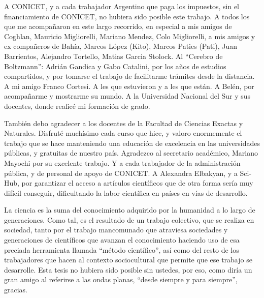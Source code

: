 A CONICET, y a cada trabajador Argentino que paga los impuestos, 
sin el financiamiento de CONICET, no hubiera sido posible este trabajo. 
A todos los que me acompañaron en este largo recorrido, 
en especial a mis amigos de Coghlan, Mauricio Migliorelli, Mariano Mendez, Colo Migliorelli, a mis amigos y 
ex compañeros de Bahía, Marcos López (Kito), Marcos Paties (Pati), Juan Barrientos, Alejandro 
Tortello, Matias Garcia Stolock. Al ``Cerebro de Boltzmann'': Adrián Gandica y Gabo Catalini, por 
los años de estudios compartidos, y por tomarse el trabajo de facilitarme trámites desde la distancia. A mi amigo Franco Cortesi. A les que estuvieron y a les que están. A Belén, 
por acompañarme y mostrarme su mundo. A la Universidad Nacional del Sur y sus 
docentes, donde realicé mi formación de grado.

También debo agradecer a los docentes de la Facultad de Ciencias Exactas y Naturales. 
Disfruté muchísimo cada curso que hice, y valoro enormemente el trabajo 
que se hace manteniendo una educación de excelencia en las universidades públicas, 
y gratuitas de nuestro país.
Agradezco al secretario académico, 
Mariano Mayochi por su excelente trabajo. 
Y a cada trabajador de la administración pública, y de personal de apoyo de 
CONICET. A Alexandra Elbakyan, y a Sci-Hub, por garantizar el acceso 
a artículos científicos que de otra forma sería muy difícil conseguir, 
dificultando la labor científica en países en vías de desarrollo.

La ciencia es la suma del conocimiento adquirido por la humanidad 
a lo largo de generaciones. Como tal, es el resultado de un trabajo colectivo, 
que se realiza en sociedad, tanto por el trabajo mancomunado 
que atraviesa sociedades y generaciones de científicos 
que avanzan el conocimiento haciendo uso 
de esa preciada herramienta llamada ``método científico'', 
así como del resto de los trabajadores que hacen al contexto sociocultural 
que permite que ese trabajo se 
desarrolle. Esta tesis no hubiera sido posible sin ustedes, 
por eso, como diría un gran amigo al referirse 
a las ondas planas, ``desde siempre y para siempre'', gracias.
